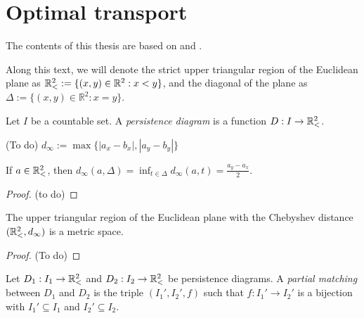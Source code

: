 \section{Optimal transport}

The contents of this thesis are based on \cite{Figalli} and \cite{Bubenik}.

Along this text, we will denote the strict upper triangular region of the Euclidean plane as $ \mathbb{R}_<^2 := \{(x, y) \in \mathbb R^2 : x < y\} $, and the diagonal of the plane as $ \Delta := \{(x, y) \in \mathbb R^2 : x = y\}$.

\begin{definition}
    Let $ I $ be a countable set. A {\it persistence diagram} is a function $ D: I \to \mathbb{R}_<^2 $.
\end{definition}

\begin{definition}(To do)
    $d_\infty := \max \{|a_x - b_x|, |a_y - b_y|\}$
\end{definition}

\begin{proposition}
    If $ a \in \mathbb{R}_<^2 $, then $ d_\infty(a, \Delta) = \inf_{t \in \Delta} d_\infty(a, t) = \frac{a_y - a_x}{2} $.
\end{proposition}
\begin{proof}
    (to do)  
\end{proof}

\begin{proposition}
    The upper triangular region of the Euclidean plane with the Chebyshev distance  $ (\mathbb{R}_<^2, d_\infty) $ is a metric space.
\end{proposition}
\begin{proof}
    (To do)
\end{proof}

\begin{definition}
    Let $ D_1: I_1 \to \mathbb{R}_<^2 $ and $ D_2: I_2 \to \mathbb{R}_<^2 $ be persistence diagrams. A {\it partial matching} between $ D_1 $ and $ D_2 $ is the triple $ (I_1', I_2', f) $ such that $ f: I_1' \to I_2' $ is a bijection with $ I_1' \subseteq I_1 $ and $ I_2' \subseteq I_2 $.
\end{definition}


